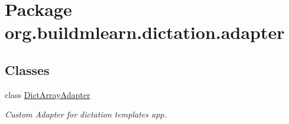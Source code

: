 \hypertarget{namespaceorg_1_1buildmlearn_1_1dictation_1_1adapter}{}\section{Package org.\+buildmlearn.\+dictation.\+adapter}
\label{namespaceorg_1_1buildmlearn_1_1dictation_1_1adapter}
\subsection*{Classes}
\begin{DoxyCompactItemize}
\item 
class \hyperlink{classorg_1_1buildmlearn_1_1dictation_1_1adapter_1_1DictArrayAdapter}{Dict\+Array\+Adapter}
\begin{DoxyCompactList}\small\item\em Custom Adapter for dictation template\textquotesingle{}s app. \end{DoxyCompactList}\end{DoxyCompactItemize}
